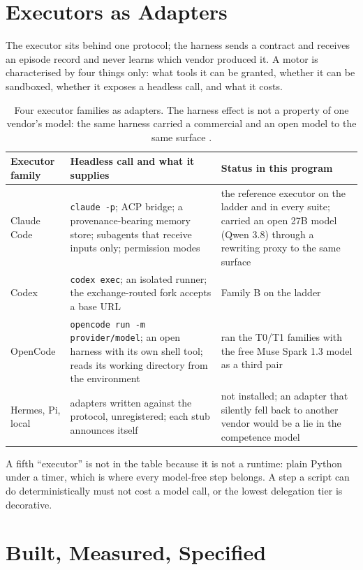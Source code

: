 \documentclass[11pt]{article}
\theoremstyle{definition}
\begin{document}
\section{Executors as Adapters}\label{sec:motors}

The executor sits behind one protocol; the harness sends a contract and receives an episode record and never learns which vendor produced it. A motor is characterised by four things only: what tools it can be granted, whether it can be sandboxed, whether it exposes a headless call, and what it costs.

\begin{table}[!htbp]
\centering\small
\begin{tabularx}{\textwidth}{@{}lYY@{}}
\toprule
Executor family & Headless call and what it supplies & Status in this program \\
\midrule
Claude Code & \texttt{claude -p}; ACP bridge; a provenance-bearing memory store; subagents that receive inputs only; permission modes & the reference executor on the ladder and in every suite; carried an open 27B model (Qwen 3.8) through a rewriting proxy to the same surface \\
Codex & \texttt{codex exec}; an isolated runner; the exchange-routed fork accepts a base URL & Family B on the ladder \\
OpenCode & \texttt{opencode run -m provider/model}; an open harness with its own shell tool; reads its working directory from the environment & ran the T0/T1 families with the free Muse Spark 1.3 model as a third pair \\
Hermes, Pi, local & adapters written against the protocol, unregistered; each stub announces itself & not installed; an adapter that silently fell back to another vendor would be a lie in the competence model \\
\bottomrule
\end{tabularx}
\caption{Four executor families as adapters. The harness effect is not a property of one vendor's model: the same harness carried a commercial and an open model to the same surface \citep{yang2026scaling}.}
\label{tab:motors}
\end{table}

A fifth ``executor'' is not in the table because it is not a runtime: plain Python under a timer, which is where every model-free step belongs. A step a script can do deterministically must not cost a model call, or the lowest delegation tier is decorative.

\section{Built, Measured, Specified}\label{sec:status}
\end{document}

